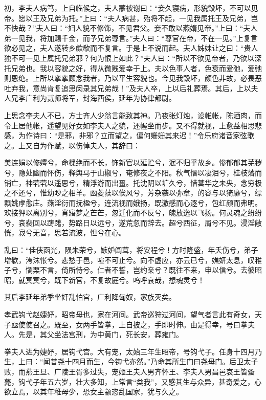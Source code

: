 \documentclass[]{article}
\begin{document}
初，李夫人病笃，上自临候之，夫人蒙被谢曰：``妾久寝病，形貌毁坏，不可以见帝。愿以王及兄弟为托。''上曰：``夫人病甚，殆将不起，一见我属托王及兄弟，岂不快哉？''夫人曰：``妇人貌不修饰，不见君父。妾不敢以燕媠见帝。''上曰：``夫人弟一见我，将加赐千金，而予兄弟尊言。''夫人曰：``尊官在帝，不在一见。''上复言欲必见之，夫人遂转乡歔欷而不复言。于是上不说而起。夫人姊妹让之曰：``贵人独不可一见上属托兄弟邪？何为恨上如此？''夫人曰：``所以不欲见帝者，乃欲以深托兄弟也。我以容貌之好，得从微贱爱幸于上。夫以色事人者，色衰而爱弛，爱弛则恩绝。上所以挛挛顾念我者，乃以平生容貌也。今见我毁坏，颜色非故，必畏恶吐弃我，意尚肯复追思闵录其兄弟哉！''及夫人卒，上以后礼葬焉。其后，上以夫人兄李广利为贰师将军，封海西侯，延年为协律都尉。

上思念李夫人不已，方士齐人少翁言能致其神。乃夜张灯烛，设帷帐，陈酒肉，而令上居他帐，遥望见好女如李夫人之貌，还幄坐而步。又不得就视，上愈益相思悲感，为作诗曰：``是邪，非邪？立而望之，偏何姗姗其来迟！''令乐府诸音家弦歌之。上又自为作赋，以伤悼夫人，其辞曰：

美连娟以修嫮兮，命樔绝而不长，饰新官以延贮兮，泯不归乎故乡。惨郁郁其芜秽兮，隐处幽而怀伤，释舆马于山椒兮，奄修夜之不阳。秋气憯以凄泪兮，桂枝落而销亡，神茕茕以遥思兮，精浮游而出畺。托沈阴以圹久兮，惜蕃华之未央，念穷极之不还兮，惟幼眇之相羊。函菱荴以俟风兮，芳杂袭以弥章，的容与以猗靡兮，缥飘姚虖愈庄。燕淫衍而抚楹兮，连流视而娥扬，既激感而心逐兮，包红颜而弗明。欢接狎以离别兮，宵寤梦之芒芒，忽迁化而不反兮，魄放逸以飞扬。何灵魂之纷纷兮，哀裴回以踌躇，势路日以远兮，遂荒忽而辞去。超兮西征，屑兮不见。浸淫敞恍，寂兮无音，思若流波，怛兮在心。

乱曰：``佳侠函光，陨朱荣兮，嫉妒阘茸，将安程兮！方时隆盛，年夭伤兮，弟子增欷，洿沬怅兮。悲愁于邑，喧不可止兮。向不虚应，亦云已兮，嫶妍太息，叹稚子兮，懰栗不言，倚所恃兮。仁者不誓，岂约亲兮？既往不来，申以信兮。去彼昭昭，就冥冥兮，既下新官，不复故庭兮。呜呼哀哉，想魂灵兮！

其后李延年弟季坐奸乱怕宫，广利降匈奴，家族灭矣。

孝武钩弋赵婕妤，昭帝母也，家在河间。武帝巡狩过河间，望气者言此有奇女，天子亟使使召之。既至，女两手皆拳，上自披之，手即时伸。由是得幸，号曰拳夫人。先是，其父坐法宫刑，为中黄门，死长安，葬雍门。

拳夫人进为婕妤，居钩弋宫。大有宠，太始三年生昭帝，号钩弋子。任身十四月乃生，上曰：``闻昔尧十四月而生，今钩弋亦然。''乃命其所生门曰尧母门。后卫太子败，而燕王旦、广陵王胥多过失，宠姬王夫人男齐怀王、李夫人男昌邑哀王皆蚤薨，钩弋子年五六岁，壮大多知，上常言``类我''，又感其生与众异，甚奇爱之，心欲立焉，以其年稚母少，恐女主颛恣乱国家，犹与久之。
\end{document}
